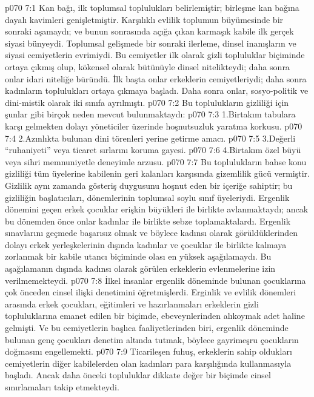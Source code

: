 \vs p070 7:1 Kan bağı, ilk toplumsal toplulukları belirlemiştir; birleşme kan bağına dayalı kavimleri genişletmiştir. Karşılıklı evlilik toplumun büyümesinde bir sonraki aşamaydı; ve bunun sonrasında açığa çıkan karmaşık kabile ilk gerçek siyasi bünyeydi. Toplumsal gelişmede bir sonraki ilerleme, dinsel inanışların ve siyasi cemiyetlerin evrimiydi. Bu cemiyetler ilk olarak gizli topluluklar biçiminde ortaya çıkmış olup, kökensel olarak bütünüyle dinsel nitelikteydi; daha sonra onlar idari niteliğe büründü. İlk başta onlar erkeklerin cemiyetleriydi; daha sonra kadınların toplulukları ortaya çıkmaya başladı. Daha sonra onlar, sosyo\hyp{}politik ve dini\hyp{}mistik olarak iki sınıfa ayrılmıştı.
\vs p070 7:2 Bu toplulukların gizliliği için şunlar gibi birçok neden mevcut bulunmaktaydı:
\vs p070 7:3 1.\bibnobreakspace Birtakım tabulara karşı gelmekten dolayı yöneticiler üzerinde hoşnutsuzluk yaratma korkusu.
\vs p070 7:4 2.\bibnobreakspace Azınlıkta bulunan dini törenleri yerine getirme amacı.
\vs p070 7:5 3.\bibnobreakspace Değerli “ruhaniyeti” veya ticaret sırlarını koruma gayesi.
\vs p070 7:6 4.\bibnobreakspace Birtakım özel büyü veya sihri memnuniyetle deneyimle arzusu.
\vs p070 7:7 Bu toplulukların bahse konu gizliliği tüm üyelerine kabilenin geri kalanları karşısında gizemlilik gücü vermiştir. Gizlilik aynı zamanda gösteriş duygusunu hoşnut eden bir içeriğe sahiptir; bu gizliliğin başlatıcıları, dönemlerinin toplumsal soylu sınıf üyeleriydi. Ergenlik dönemini geçen erkek çocuklar erişkin büyükleri ile birlikte avlanmaktaydı; ancak bu dönemden önce onlar kadınlar ile birlikte sebze toplamaktalardı. Ergenlik sınavlarını geçmede başarısız olmak ve böylece kadınsı olarak görüldüklerinden dolayı erkek yerleşkelerinin dışında kadınlar ve çocuklar ile birlikte kalmaya zorlanmak bir kabile utancı biçiminde olası en yüksek aşağılamaydı. Bu aşağılamanın dışında kadınsı olarak görülen erkeklerin evlenmelerine izin verilmemekteydi.
\vs p070 7:8 İlkel insanlar ergenlik döneminde bulunan çocuklarına çok önceden cinsel ilişki denetimini öğretmişlerdi. Erginlik ve evlilik dönemleri arasında erkek çocukları, eğitimleri ve hazırlanmaları erkeklerin gizli topluluklarına emanet edilen bir biçimde, ebeveynlerinden alıkoymak adet haline gelmişti. Ve bu cemiyetlerin başlıca faaliyetlerinden biri, ergenlik döneminde bulunan genç çocukları denetim altında tutmak, böylece gayrimeşru çocukların doğmasını engellemekti.
\vs p070 7:9 Ticarileşen fuhuş, erkeklerin sahip oldukları cemiyetlerin diğer kabilelerden olan kadınları para karşılığında kullanmasıyla başladı. Ancak daha önceki topluluklar dikkate değer bir biçimde cinsel sınırlamaları takip etmekteydi.
